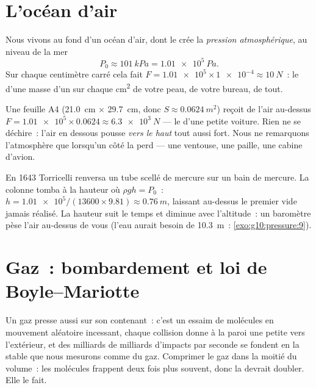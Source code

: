 \section{L'océan d'air}

\begin{definition}\label{def:g10:pressure:atmospheric}
Nous vivons au fond d'un océan d'air, dont le
 crée la \emph{pression
atmosphérique}, au niveau de la mer
\[
P_0 \approx \qty{101}{kPa} = \qty{1.01e5}{Pa}.
\]
Sur chaque centimètre carré cela fait
$F = \num{1.01e5} \times \num{1e-4} \approx \qty{10}{N}$~: le
 d'une masse d'un  sur
chaque \unit{cm^2} de votre peau, de votre bureau, de tout.
\end{definition}

\begin{example}\label{ex:g10:pressure:sheet}
Une feuille A4 (\qty{21.0}{cm} $\times$ \qty{29.7}{cm}, donc
$S \approx \qty{0.0624}{m^2}$) reçoit de l'air au-dessus
$F = \num{1.01e5} \times 0.0624 \approx \qty{6.3e3}{N}$ --- le
 d'une petite voiture. Rien ne se déchire~: l'air
en dessous pousse \emph{vers le haut} tout aussi fort. Nous ne
remarquons l'atmosphère que lorsqu'un côté la perd --- une ventouse, une
paille, une cabine d'avion.
\end{example}

\begin{remark}\label{rem:g10:pressure:torricelli}
En 1643 Torricelli renversa un tube scellé de mercure sur un bain de
mercure. La colonne tomba à la hauteur où $\rho g h = P_0$~:
$h = \num{1.01e5}/(13600 \times 9.81) \approx \qty{0.76}{m}$, laissant
au-dessus le premier vide jamais réalisé. La hauteur suit le temps et
diminue avec l'altitude~: un baromètre pèse l'air au-dessus de vous
(l'eau aurait besoin de \qty{10.3}{m}~: \cref{exo:g10:pressure:9}).
\end{remark}

\section{Gaz~: bombardement et loi de Boyle--Mariotte}

Un gaz presse aussi sur son contenant~: c'est un essaim de molécules en
mouvement aléatoire incessant, chaque collision donne à la paroi une
petite  vers l'extérieur, et des milliards de milliards
d'impacts par seconde se fondent en la  stable que
nous mesurons comme  du gaz. Comprimer le gaz
dans la moitié du volume~: les molécules frappent deux fois plus
souvent, donc la  devrait doubler. Elle le fait.

